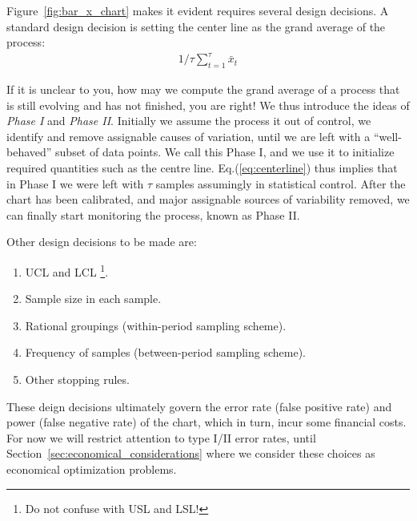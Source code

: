 Figure~\ref{fig:bar_x_chart} makes it evident \barxChart requires several design decisions.
A standard design decision is setting the center line as the grand average of the process: 
\begin{align}
\label{eq:centerline}
	1/\tau \sum_{t=1}^\tau \bar{x}_t
\end{align}


If it is unclear to you, how may we compute the grand average of a process that is still evolving and has not finished, you are right! We thus introduce the ideas of \emph{Phase I} and \emph{Phase II}. 
Initially we assume the process it out of control, we identify and remove assignable causes of variation, until we are left with a ``well-behaved'' subset of data points. We call this Phase I, and we use it to initialize required quantities such as the centre line. 
Eq.(\ref{eq:centerline}) thus implies that in Phase I we were left with $\tau$ samples assumingly in statistical control.
After the chart has been calibrated, and major assignable sources of variability removed, we can finally start monitoring the process, known as Phase II.



Other design decisions to be made are:
\begin{enumerate}
\item UCL and LCL \footnote{Do not confuse with USL and LSL!}.
\item Sample size in each sample.
\item Rational groupings (within-period sampling scheme).
\item Frequency of samples (between-period sampling scheme). 
\item Other stopping rules.
\end{enumerate}
These deign decisions ultimately govern the error rate (false positive rate) and power (false negative rate) of the chart, which in turn, incur some financial costs. 
For now we will restrict attention to type I/II error rates, until Section~\ref{sec:economical_considerations} where we consider these choices as economical optimization problems.

